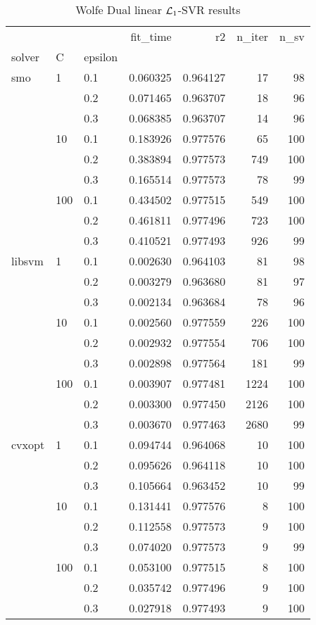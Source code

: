 \begin{table}[H]
\centering
\caption{Wolfe Dual linear $\protect \mathcal{L}_1$-SVR results}
\label{linear_dual_l1_svr_cv_results}
\begin{tabular}{lllrrrr}
\toprule
       &     &     &  fit\_time &        r2 &  n\_iter &  n\_sv \\
solver & C & epsilon &           &           &         &       \\
\midrule
smo & 1   & 0.1 &  0.060325 &  0.964127 &      17 &    98 \\
       &     & 0.2 &  0.071465 &  0.963707 &      18 &    96 \\
       &     & 0.3 &  0.068385 &  0.963707 &      14 &    96 \\
       & 10  & 0.1 &  0.183926 &  0.977576 &      65 &   100 \\
       &     & 0.2 &  0.383894 &  0.977573 &     749 &   100 \\
       &     & 0.3 &  0.165514 &  0.977573 &      78 &    99 \\
       & 100 & 0.1 &  0.434502 &  0.977515 &     549 &   100 \\
       &     & 0.2 &  0.461811 &  0.977496 &     723 &   100 \\
       &     & 0.3 &  0.410521 &  0.977493 &     926 &    99 \\
libsvm & 1   & 0.1 &  0.002630 &  0.964103 &      81 &    98 \\
       &     & 0.2 &  0.003279 &  0.963680 &      81 &    97 \\
       &     & 0.3 &  0.002134 &  0.963684 &      78 &    96 \\
       & 10  & 0.1 &  0.002560 &  0.977559 &     226 &   100 \\
       &     & 0.2 &  0.002932 &  0.977554 &     706 &   100 \\
       &     & 0.3 &  0.002898 &  0.977564 &     181 &    99 \\
       & 100 & 0.1 &  0.003907 &  0.977481 &    1224 &   100 \\
       &     & 0.2 &  0.003300 &  0.977450 &    2126 &   100 \\
       &     & 0.3 &  0.003670 &  0.977463 &    2680 &    99 \\
cvxopt & 1   & 0.1 &  0.094744 &  0.964068 &      10 &   100 \\
       &     & 0.2 &  0.095626 &  0.964118 &      10 &   100 \\
       &     & 0.3 &  0.105664 &  0.963452 &      10 &    99 \\
       & 10  & 0.1 &  0.131441 &  0.977576 &       8 &   100 \\
       &     & 0.2 &  0.112558 &  0.977573 &       9 &   100 \\
       &     & 0.3 &  0.074020 &  0.977573 &       9 &    99 \\
       & 100 & 0.1 &  0.053100 &  0.977515 &       8 &   100 \\
       &     & 0.2 &  0.035742 &  0.977496 &       9 &   100 \\
       &     & 0.3 &  0.027918 &  0.977493 &       9 &   100 \\
\bottomrule
\end{tabular}
\end{table}
